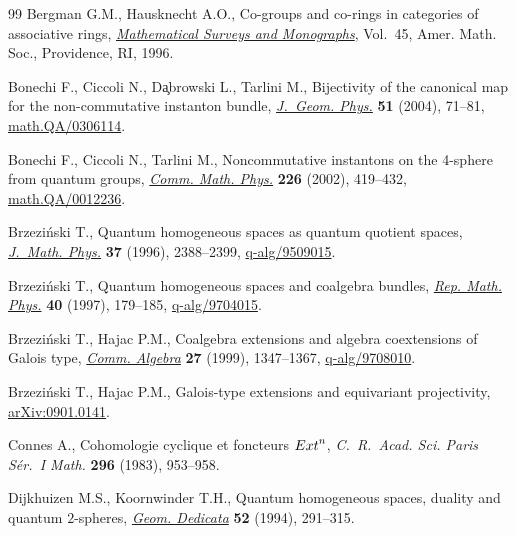\documentclass[11pt]{article}
\numberwithin{equation}{section}
\let\originalcedilla\c
\renewcommand{\c}[1]{{\fontspec{DejaVu Serif}\originalcedilla{#1}}}
\begin{document}
\begin{thebibliography}{99}
Bergman G.M., Hausknecht A.O., Co-groups and co-rings in categories of
  associative rings, \href{http://dx.doi.org/10.1090/surv/045}{\textit{Mathematical Surveys and Monographs}}, Vol.~45,
  Amer. Math. Soc., Providence, RI, 1996.

Bonechi F., Ciccoli N., D\c{a}browski L., Tarlini M., Bijectivity of the
  canonical map for the non-commutative instanton bundle, \href{http://dx.doi.org/10.1016/j.geomphys.2003.09.007}{\textit{J.~Geom.
  Phys.}} \textbf{51} (2004), 71--81, \href{http://arxiv.org/abs/math.QA/0306114}{math.QA/0306114}.

Bonechi F., Ciccoli N., Tarlini M., Noncommutative instantons on the 4-sphere
  from quantum groups, \href{http://dx.doi.org/10.1007/s002200200618}{\textit{Comm. Math. Phys.}} \textbf{226} (2002),
  419--432, \href{http://arxiv.org/abs/math.QA/0012236}{math.QA/0012236}.

Brzezi{\'n}ski T., Quantum homogeneous spaces as quantum quotient spaces,
  \href{http://dx.doi.org/10.1063/1.531517}{\textit{J.~Math. Phys.}} \textbf{37} (1996), 2388--2399,
  \href{http://arxiv.org/abs/q-alg/9509015}{q-alg/9509015}.

Brzezi{\'n}ski T., Quantum homogeneous spaces and coalgebra bundles,
  \href{http://dx.doi.org/10.1016/S0034-4877(97)85914-9}{\textit{Rep. Math. Phys.}} \textbf{40} (1997), 179--185,
  \href{http://arxiv.org/abs/q-alg/9704015}{q-alg/9704015}.



Brzezi{\'n}ski T., Hajac P.M., Coalgebra extensions and algebra coextensions of
  {G}alois type, \href{http://dx.doi.org/10.1080/00927879908826498}{\textit{Comm. Algebra}} \textbf{27} (1999), 1347--1367,
  \href{http://arxiv.org/abs/q-alg/9708010}{q-alg/9708010}.

Brzezi{\'n}ski T., Hajac P.M., {G}alois-type extensions and equivariant
  projectivity, \href{http://arxiv.org/abs/0901.0141}{arXiv:0901.0141}.

Connes A., Cohomologie cyclique et foncteurs {${\rm Ext}^n$},
  \textit{C.~R.~Acad. Sci. Paris S\'er.~I Math.} \textbf{296} (1983), 953--958.

Dijkhuizen M.S., Koornwinder T.H., Quantum homogeneous spaces, duality and
  quantum {$2$}-spheres, \href{http://dx.doi.org/10.1007/BF01278478}{\textit{Geom. Dedicata}} \textbf{52} (1994), 291--315.


\end{thebibliography}
\end{document}
